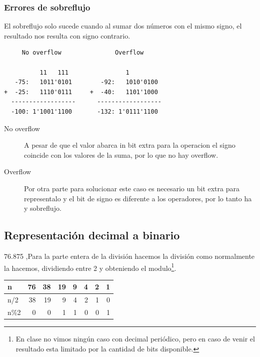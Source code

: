 \documentclass[11pt]{article}
\begin{document}
\subsubsection*{Errores de sobreflujo}
\label{sec:org489b142}
\begin{mdframed}
El sobreflujo solo sucede cuando al sumar dos números con el mismo signo, el resultado nos resulta con signo contrario.
\end{mdframed}

\begin{verbatim}
     No overflow               Overflow

          11   111                1       
   -75:   1011'0101        -92:   1010'0100
+  -25:   1110'0111     +  -40:   1101'1000 
  ------------------      ------------------      
  -100: 1'1001'1100       -132: 1'0111'1100
\end{verbatim}

\begin{description}
\item[{No overflow}] A pesar de que el valor abarca in bit extra para la operacion el signo coincide con los valores de la suma, por lo que no hay overflow.

\item[{Overflow}] Por otra parte para solucionar este caso es necesario un bit extra para representalo y el bit de signo es diferente a los operadores, por lo tanto ha y sobreflujo.
\end{description}

\subsection{Representación decimal a binario}
\label{sec:org42033a1}
76.875 ,Para la parte entera de la división hacemos la división como normalmente la hacemos, dividiendo entre 2 y obteniendo el modulo\footnote{En clase no vimos ningún caso con decimal periódico, pero en caso de venir el resultado esta limitado por la cantidad de bits disponible.}.

\begin{center}
\begin{tabular}{|l|r|r|r|r|r|r|r|}
\hline
n & 76 & 38 & 19 & 9 & 4 & 2 & 1\\
\hline
n/2 & 38 & 19 & 9 & 4 & 2 & 1 & 0\\
n\%2 & 0 & 0 & 1 & 1 & 0 & 0 & 1\\
\hline
\end{tabular}
\end{center}
\end{document}
